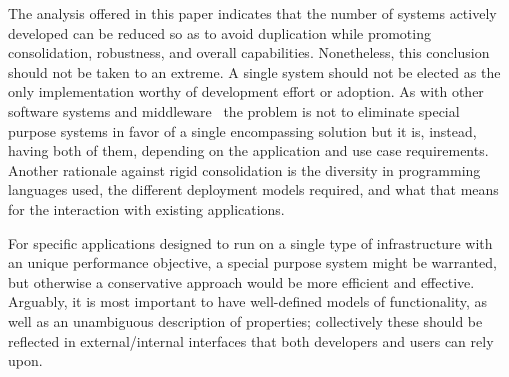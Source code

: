 \documentclass{sig-alternate}
\begin{document}


The analysis offered in this paper indicates that the number of \pilot systems
actively developed can be reduced so as to avoid duplication while promoting
consolidation, robustness, and overall capabilities.  Nonetheless, this
conclusion should not be taken to an extreme. A single \pilot system should not
be elected as the only implementation worthy of development effort or adoption.
As with other software systems and middleware~\cite{bernstein1996} the problem
is not to eliminate special purpose systems in favor of a single encompassing
solution but it is, instead, having both of them, depending on the application
and use case requirements.  Another rationale against rigid consolidation is the
diversity in programming languages used, the different deployment models
required, and what that means for the interaction with existing applications.

For specific applications designed to run on a single type of infrastructure
with an unique performance objective, a special purpose system might be
warranted, but otherwise a conservative approach would be more efficient and
effective. Arguably, it is most important to have well-defined models of \pilot
functionality, as well as an unambiguous description of properties; collectively
these should be reflected in external/internal interfaces that both developers
and users can rely upon.
\end{document}

